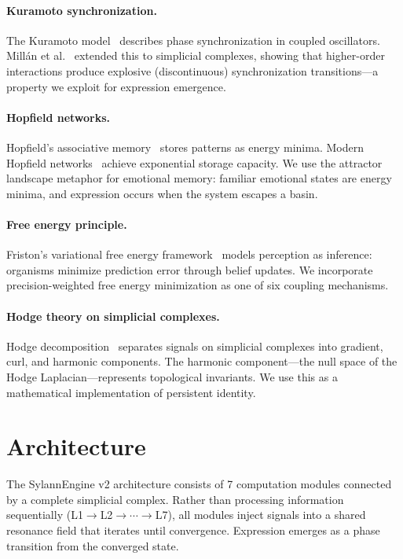 \documentclass[11pt]{article}
\begin{document}
\paragraph{Kuramoto synchronization.} The Kuramoto model~\cite{kuramoto1975} describes phase synchronization in coupled oscillators. Mill\'an et al.~\cite{millan2020} extended this to simplicial complexes, showing that higher-order interactions produce explosive (discontinuous) synchronization transitions---a property we exploit for expression emergence.

\paragraph{Hopfield networks.} Hopfield's associative memory~\cite{hopfield1982} stores patterns as energy minima. Modern Hopfield networks~\cite{ramsauer2020} achieve exponential storage capacity. We use the attractor landscape metaphor for emotional memory: familiar emotional states are energy minima, and expression occurs when the system escapes a basin.

\paragraph{Free energy principle.} Friston's variational free energy framework~\cite{friston2010} models perception as inference: organisms minimize prediction error through belief updates. We incorporate precision-weighted free energy minimization as one of six coupling mechanisms.

\paragraph{Hodge theory on simplicial complexes.} Hodge decomposition~\cite{hodge1941} separates signals on simplicial complexes into gradient, curl, and harmonic components. The harmonic component---the null space of the Hodge Laplacian---represents topological invariants. We use this as a mathematical implementation of persistent identity.

\section{Architecture}
\label{sec:architecture}

The SylannEngine v2 architecture consists of 7 computation modules connected by a complete simplicial complex. Rather than processing information sequentially (L1$\to$L2$\to\cdots\to$L7), all modules inject signals into a shared resonance field that iterates until convergence. Expression emerges as a phase transition from the converged state.
\end{document}
